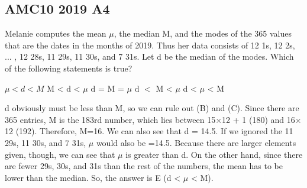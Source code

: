 \documentclass[12pt]{exam}
\begin{document}
\thispagestyle{empty}

\begin{center}\section*{AMC10 2019 A4}

\end{center}
\bigskip
\begin{questions}

\question 
Melanie computes the mean $\mu$, the median M, and the modes of the 365 values 
that are the dates in the months of 2019. 
Thus her data consists of 12 1s, 12 2s, ... , 12 28s, 11 29s, 11 30s, and 7 31s. 
Let d be the median of the modes. 
Which of the following statements is true?
\bigskip

\begin{oneparchoices}
    \choice $\mu < d < M$
    \choice M < d < $\mu$
    \choice d = M = $\mu$
    \choice d $<$ M < $\mu$
    \choice d < $\mu$ < M
\end{oneparchoices}

\vspace{0.5cm}
d obviously must be less than M, 
so we can rule out (B) and (C). 
Since there are 365 entries, M is the 183rd number, 
which lies between 15$\times$12 + 1 (180) and 16$\times$12 (192). 
Therefore, M=16. We can also see that d = 14.5. 
If we ignored the 11 29s, 11 30s, and 7 31s, 
$\mu$ would also be =14.5. Because there are larger elements given, 
though, we can see that $\mu$ is greater than d. 
On the other hand, since there are fewer 29s, 30s, and 31s than the rest of the numbers,
 the mean has to be lower than the median. 
 So, the answer is E (d < $\mu$ < M).

\end{questions}
\end{document}
